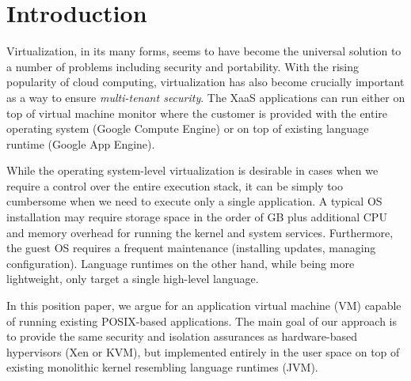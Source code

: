 \section{Introduction}
\label{sec:intro}



Virtualization, in its many forms, seems to have become the universal
solution to a number of problems including security and portability.
With the rising popularity of cloud computing, virtualization has also
become crucially important as a way to ensure \emph{multi-tenant
security}. The XaaS applications can run either on top of virtual
machine monitor where the customer is provided with the entire operating
system (\eg Google Compute Engine) or on top of existing language
runtime (\eg Google App Engine).

While the operating system-level virtualization is desirable in cases
when we require a control over the entire execution stack, it can be
simply too cumbersome when we need to execute only a single application.
A typical OS installation may require storage space in the order of GB
plus additional CPU and memory overhead for running the kernel and
system services. Furthermore, the guest OS requires a frequent
maintenance (\eg installing updates, managing configuration). Language
runtimes on the other hand, while being more lightweight, only target a
single high-level language. 

In this position paper, we argue for an application virtual machine (VM)
capable of running existing POSIX-based applications. The main goal of
our approach is to provide the same security and isolation assurances as
hardware-based hypervisors (\eg Xen or KVM), but implemented entirely in
the user space on top of existing monolithic kernel resembling language
runtimes (\eg JVM).



